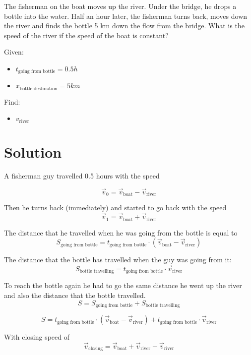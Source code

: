 The fisherman on the boat moves up the river. Under the bridge, he drops a bottle into the water.
Half an hour later, the fisherman turns back, moves down the river and finds the bottle 5 km
down the flow from the bridge. What is the speed of the river if the speed of the boat is constant?

\bigbreak Given: \begin{itemize}
    \item $t_{\text{going from bottle}} = 0.5h$
    \item $x_{\text{bottle destination}} = 5km$
\end{itemize}

Find: \begin{itemize}
    \item $v_{\text{river}}$
\end{itemize}

\section*{Solution}

A fisherman guy travelled 0.5 hours with the speed

$$\Vec{v}_0 = \Vec{v}_{\text{boat}} - \Vec{v}_{\text{river}}$$

Then he turns back (immediately) and started to go back with the speed
\[
    \Vec{v}_1 = \Vec{v}_{\text{boat}} + \Vec{v}_{\text{river}}
\]

The distance that he travelled when he was going from the bottle is equal to
$$S_{\text{going from bottle}} = t_{\text{going from bottle}} \cdot (\Vec{v}_{\text{boat}} - \Vec{v}_{\text{river}})$$

The distance that the bottle has travelled when the guy was going from it:
$$S_{\text{bottle travelling}} = t_{\text{going from bottle}} \cdot \Vec{v}_{\text{river}}$$

To reach the bottle again he had to go the same distance he went up the river and also the distance that the bottle travelled.
$$S = S_{\text{going from bottle}} + S_{\text{bottle travelling}}$$

\begin{equation}
    \label{eq:1}
    S = t_{\text{going from bottle}} \cdot (\Vec{v}_{\text{boat}} - \Vec{v}_{\text{river}}) + t_{\text{going from bottle}} \cdot \Vec{v}_{\text{river}}
\end{equation}

With closing speed of
\begin{equation}
    \label{eq:2}
    \Vec{v}_\text{closing} = \Vec{v}_{\text{boat}} + \Vec{v}_{\text{river}} - \Vec{v}_{\text{river}}
\end{equation}

